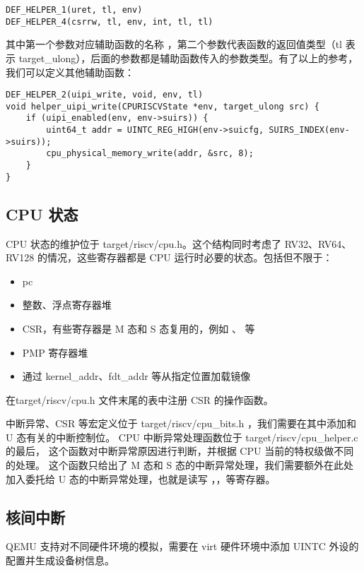 \begin{lstlisting}[style=CStyle]
DEF_HELPER_1(uret, tl, env)
DEF_HELPER_4(csrrw, tl, env, int, tl, tl)
\end{lstlisting}

其中第一个参数对应辅助函数的名称 ，第二个参数代表函数的返回值类型（tl 表示 target\_ulong），后面的参数都是辅助函数传入的参数类型。有了以上的参考，我们可以定义其他辅助函数：

\begin{lstlisting}[style=CStyle]
DEF_HELPER_2(uipi_write, void, env, tl)
void helper_uipi_write(CPURISCVState *env, target_ulong src) {
    if (uipi_enabled(env, env->suirs)) {
        uint64_t addr = UINTC_REG_HIGH(env->suicfg, SUIRS_INDEX(env->suirs));
        cpu_physical_memory_write(addr, &src, 8);
    }
}
\end{lstlisting}

\subsection{CPU 状态}

CPU 状态的维护位于 target/riscv/cpu.h。这个结构同时考虑了 RV32、RV64、RV128 的情况，这些寄存器都是 CPU 运行时必要的状态。包括但不限于：

\begin{itemize}
    \item pc
    \item 整数、浮点寄存器堆
    \item CSR，有些寄存器是 M 态和 S 态复用的，例如 \Rmstatus、 \Rmip 等
    \item PMP 寄存器堆
    \item 通过 kernel\_addr、fdt\_addr 等从指定位置加载镜像
\end{itemize}

在target/riscv/cpu.h 文件末尾的表中注册 CSR 的操作函数。

中断异常、CSR 等宏定义位于 target/riscv/cpu\_bits.h ，我们需要在其中添加和 U 态有关的中断控制位。
CPU 中断异常处理函数位于 target/riscv/cpu\_helper.c 的最后，
这个函数对中断异常原因进行判断，并根据 CPU 当前的特权级做不同的处理。
这个函数只给出了 M 态和 S 态的中断异常处理，我们需要额外在此处加入委托给 U 态的中断异常处理，也就是读写 \Rustatus，\Rucause，\Ruepc 等寄存器。

\subsection{核间中断}

QEMU 支持对不同硬件环境的模拟，需要在 virt 硬件环境中添加 UINTC 外设的配置并生成设备树信息。

